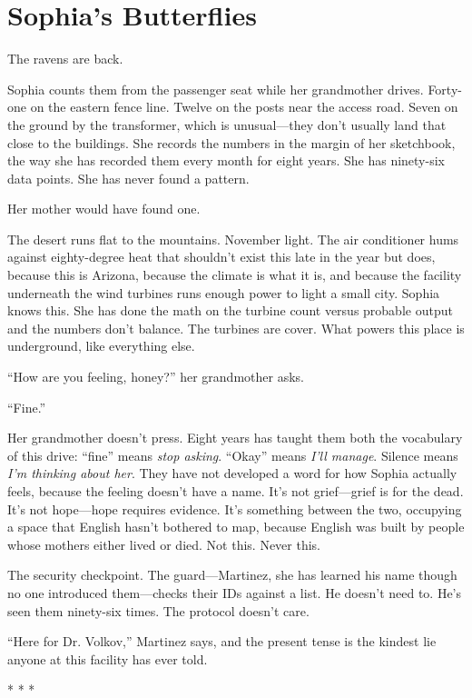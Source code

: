 \chapter{Sophia's Butterflies}

The ravens are back.

Sophia counts them from the passenger seat while her grandmother drives. Forty-one on the eastern fence line. Twelve on the posts near the access road. Seven on the ground by the transformer, which is unusual---they don't usually land that close to the buildings. She records the numbers in the margin of her sketchbook, the way she has recorded them every month for eight years. She has ninety-six data points. She has never found a pattern.

Her mother would have found one.

The desert runs flat to the mountains. November light. The air conditioner hums against eighty-degree heat that shouldn't exist this late in the year but does, because this is Arizona, because the climate is what it is, and because the facility underneath the wind turbines runs enough power to light a small city. Sophia knows this. She has done the math on the turbine count versus probable output and the numbers don't balance. The turbines are cover. What powers this place is underground, like everything else.

``How are you feeling, honey?'' her grandmother asks.

``Fine.''

Her grandmother doesn't press. Eight years has taught them both the vocabulary of this drive: ``fine'' means \textit{stop asking}. ``Okay'' means \textit{I'll manage}. Silence means \textit{I'm thinking about her}. They have not developed a word for how Sophia actually feels, because the feeling doesn't have a name. It's not grief---grief is for the dead. It's not hope---hope requires evidence. It's something between the two, occupying a space that English hasn't bothered to map, because English was built by people whose mothers either lived or died. Not this. Never this.

The security checkpoint. The guard---Martinez, she has learned his name though no one introduced them---checks their IDs against a list. He doesn't need to. He's seen them ninety-six times. The protocol doesn't care.

``Here for Dr. Volkov,'' Martinez says, and the present tense is the kindest lie anyone at this facility has ever told.

\begin{center}
* * *
\end{center}

